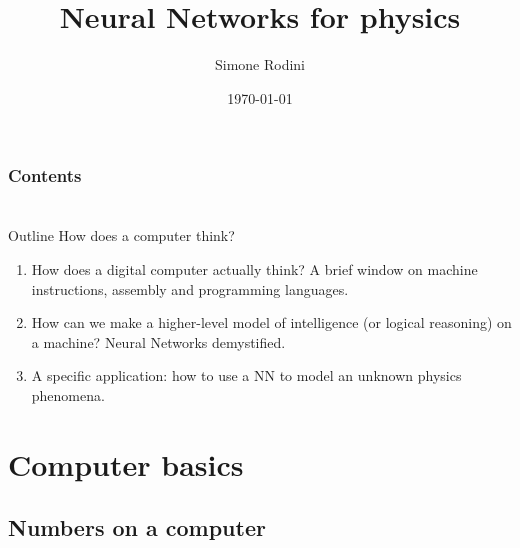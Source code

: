 \documentclass[10pt]{beamer}
\title{Neural Networks for physics}
\author[S. Rodini]{Simone Rodini}
\date[\today]{\today}
\renewcommand{\[}{\begin{equation*}}
\renewcommand{\]}{\end{equation*}}
\begin{document}
\frame{\titlepage}
\begin{frame}
\frametitle{Contents}
\tableofcontents
\end{frame}
\section{}
\begin{frame}{Outline}
How does a computer think? 
\begin{enumerate}
\item How does a digital computer actually think? A brief window on machine instructions, assembly and programming languages.
\item How can we make a higher-level model of intelligence (or logical reasoning) on a machine? Neural Networks demystified.
\item A specific application: how to use a NN to model an unknown physics phenomena.
\end{enumerate}
\end{frame}

\section{Computer basics}
\subsection{Numbers on a computer}
\end{document}
